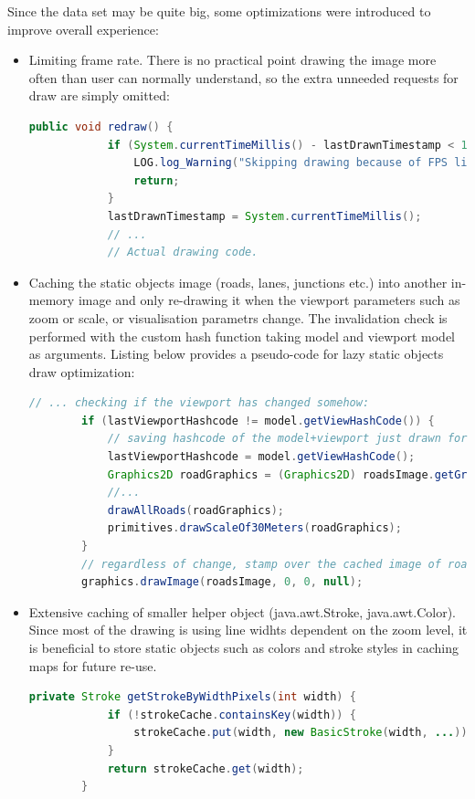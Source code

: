 Since the data set may be quite big, some optimizations were introduced to improve overall experience:
\begin{itemize}
    \item Limiting frame rate. There is no practical point drawing the image more often than user can normally understand, so the extra unneeded requests for draw are simply omitted:
    \begin{lstlisting}[language=java]
        public void redraw() {
            if (System.currentTimeMillis() - lastDrawnTimestamp < 1000 / MAX_FRAME_RATE) {
                LOG.log_Warning("Skipping drawing because of FPS limitation.");
                return;
            }
            lastDrawnTimestamp = System.currentTimeMillis();
            // ...
            // Actual drawing code.
    \end{lstlisting}

    \item Caching the static objects image (roads, lanes, junctions etc.) into another in-memory image and only re-drawing it when the viewport parameters such as zoom or scale, or visualisation parametrs change. The invalidation check is performed with the custom hash function taking model and viewport model as arguments. Listing below provides a pseudo-code for lazy static objects draw optimization:
    \begin{lstlisting}[language=java]
        // ... checking if the viewport has changed somehow:
        if (lastViewportHashcode != model.getViewHashCode()) {
            // saving hashcode of the model+viewport just drawn for future check
            lastViewportHashcode = model.getViewHashCode();
            Graphics2D roadGraphics = (Graphics2D) roadsImage.getGraphics();
            //...
            drawAllRoads(roadGraphics);
            primitives.drawScaleOf30Meters(roadGraphics);
        }
        // regardless of change, stamp over the cached image of roads onto resulting image
        graphics.drawImage(roadsImage, 0, 0, null);
    \end{lstlisting}
    \item Extensive caching of smaller helper object (java.awt.Stroke, java.awt.Color). Since most of the drawing is using line widhts dependent on the zoom level, it is beneficial to store static objects such as colors and stroke styles in caching maps for future re-use.
    \begin{lstlisting}[language=java]
        private Stroke getStrokeByWidthPixels(int width) {
            if (!strokeCache.containsKey(width)) {
                strokeCache.put(width, new BasicStroke(width, ...));
            }
            return strokeCache.get(width);
        }
    \end{lstlisting}


\end{itemize}


